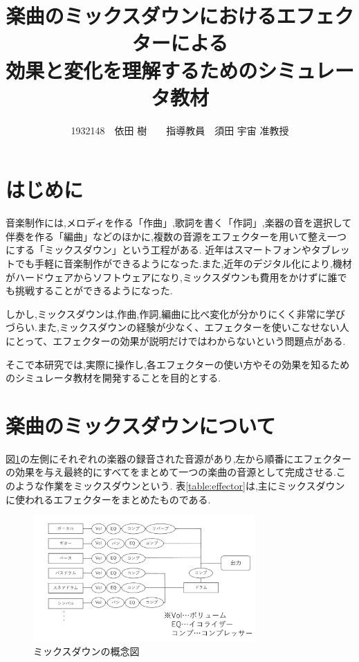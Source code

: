 \documentclass[twocolumn,10pt,a4j]{ltjsarticle}
\title{楽曲のミックスダウンにおけるエフェクターによる\\効果と変化を理解するためのシミュレータ教材}
\author{1932148　依田 樹　　指導教員　須田 宇宙 准教授}
\date{}
\begin{document}
\maketitle

\section{はじめに}
音楽制作には,メロディを作る「作曲」,歌詞を書く「作詞」,楽器の音を選択して伴奏を作る「編曲」などのほかに,複数の音源をエフェクターを用いて整え一つにする「ミックスダウン」という工程がある\cite{mix}.
近年はスマートフォンやタブレットでも手軽に音楽制作ができるようになった.また,近年のデジタル化により,機材がハードウェアからソフトウェアになり,ミックスダウンも費用をかけずに誰でも挑戦することができるようになった\cite{digital}.

しかし,ミックスダウンは,作曲,作詞,編曲に比べ変化が分かりにくく非常に学びづらい.また,ミックスダウンの経験が少なく、エフェクターを使いこなせない人にとって、エフェクターの効果が説明だけではわからないという問題点がある.

そこで本研究では,実際に操作し,各エフェクターの使い方やその効果を知るためのシミュレータ教材を開発することを目的とする.

\section{楽曲のミックスダウンについて}
図\ref{fig:gainen}の左側にそれぞれの楽器の録音された音源があり,左から順番にエフェクターの効果を与え最終的にすべてをまとめて一つの楽曲の音源として完成させる.このような作業をミックスダウンという.
表\ref{table:effector}は,主にミックスダウンに使われるエフェクターをまとめたものである.

\begin{figure}[h]
\centering
 \includegraphics[width=85mm]{./figures/gainen.pdf}
 \caption{ミックスダウンの概念図}
 \label{fig:gainen}
\end{figure}
\end{document}

